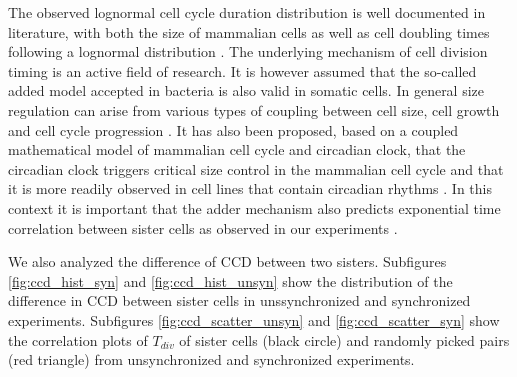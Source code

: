 \documentclass[pdftex,12pt,a4paper]{report}
\begin{document}
The observed lognormal cell cycle duration distribution is well documented in literature, with both the size of mammalian cells as well as cell doubling times following a lognormal distribution \cite{hosoda2011origin, paulus1975platelet}. The underlying mechanism of cell division timing is an active field of research. It is however assumed that the so-called added model accepted in bacteria \cite{campos2014constant} is also valid in somatic cells. In general size regulation can arise from various types of coupling between cell size, cell growth and cell cycle progression \cite{cadart2017size}. It has also been proposed, based on a coupled mathematical model of mammalian cell cycle and circadian clock, that the circadian clock triggers critical size control in the mammalian cell cycle and that it is more readily observed in cell lines that contain circadian rhythms \cite{zamborszky2007computational}. In this context it is important that the adder mechanism also predicts exponential time correlation between sister cells as observed in our experiments \cite{campos2014constant}.

We also analyzed the difference of CCD between two sisters. Subfigures \ref{fig:ccd_hist_syn} and \ref{fig:ccd_hist_unsyn} show the distribution of the difference in CCD between sister cells in unssynchronized and synchronized experiments. Subfigures \ref{fig:ccd_scatter_unsyn} and \ref{fig:ccd_scatter_syn} show the correlation plots of $T_{div}$ of sister cells (black circle) and randomly picked pairs (red triangle) from unsynchronized and synchronized experiments.
\end{document}
